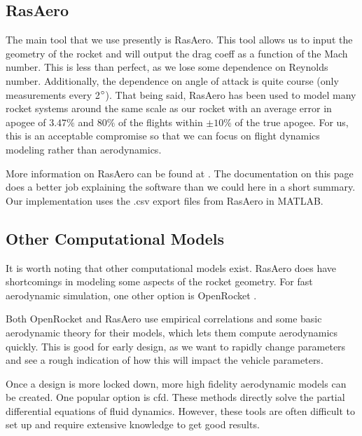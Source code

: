 \documentclass[10pt, openany, titlepage]{book}
\theoremstyle{definition}
\begin{document}
\subsection{RasAero}
The main tool that we use presently is RasAero. This tool allows us to input the geometry of the rocket and will output the \gls{drag coeff} as a function of the Mach number. This is less than perfect, as we lose some dependence on Reynolds number. Additionally, the dependence on \gls{angle of attack} is quite course (only measurements every 2$\degree$). That being said, RasAero has been used to model many rocket systems around the same scale as our rocket with an average error in apogee of $3.47\%$ and $80\%$ of the flights within $\pm10\%$ of the true apogee. For us, this is an acceptable compromise so that we can focus on flight dynamics modeling rather than aerodynamics.

More information on RasAero can be found at \cite{rogers_rasaero_2019}. The documentation on this page does a better job explaining the software than we could here in a short summary. Our implementation uses the .csv export files from RasAero in MATLAB.

\subsection{Other Computational Models}

It is worth noting that other computational models exist. RasAero does have shortcomings in modeling some aspects of the rocket geometry. For fast aerodynamic simulation, one other option is OpenRocket \cite{noauthor_openrocket_2026}.

Both OpenRocket and RasAero use empirical correlations and some basic aerodynamic theory for their models, which lets them compute aerodynamics quickly. This is good for early design, as we want to rapidly change parameters and see a rough indication of how this will impact the vehicle parameters.

Once a design is more locked down, more high fidelity aerodynamic models can be created. One popular option is \gls{cfd}. These methods directly solve the partial differential equations of fluid dynamics. However, these tools are often difficult to set up and require extensive knowledge to get good results.

\end{document}
